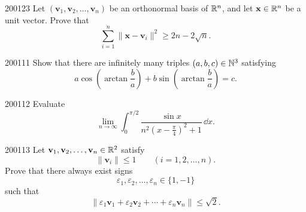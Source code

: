 \begin{problem}{2001}{2}{3}
Let $(\mathbf v_1, \mathbf v_2, \dots, \mathbf v_n)$ be an orthonormal basis of $\mathbb{R}^n$, and let $\mathbf x\in\mathbb{R}^n$ be a unit vector. Prove that
\[
    \sum_{i=1}^n\|\mathbf x-\mathbf v_i\|^2
    \ge
    2n-2\sqrt n.
\]
\end{problem}

\begin{problem}{2001}{1}{1}
Show that there are infinitely many triples $(a, b, c)\in\mathbb{N}^3$ satisfying
\[
    a\cos\left(\arctan\frac ba\right)
    +
    b\sin\left(\arctan\frac ba\right)
    =c.
\]
\end{problem}

\begin{problem}{2001}{1}{2}
Evaluate
\[
    \lim_{n\to\infty}
    \int_0^{\pi/2}
    \frac{\sin x}{n^2\left(x-\frac\pi4\right)^2+1}\, \dd x.
\]
\end{problem}

\begin{problem}{2001}{1}{3}
Let $\mathbf v_1, \mathbf v_2, \dots, \mathbf v_n\in\mathbb{R}^2$ satisfy
\[
    \|\mathbf v_i\|\le1
    \qquad
    (i=1, 2, \dots, n).
\]
Prove that there always exist signs
\[
    \varepsilon_1, \varepsilon_2, \dots, \varepsilon_n\in\{1, -1\}
\]
such that
\[
    \|\varepsilon_1\mathbf v_1+\varepsilon_2\mathbf v_2+\cdots+\varepsilon_n\mathbf v_n\|
    \le\sqrt2.
\]
\end{problem}
